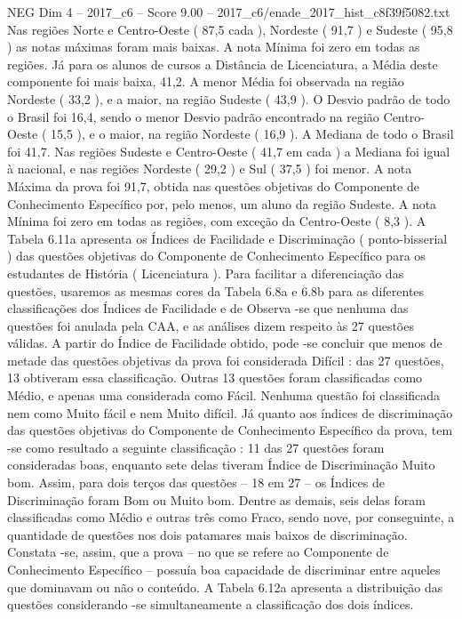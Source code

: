 \begin{textsample}{NEG Dim 4 – 2017\_c6 – Score 9.00 – 2017\_c6/enade\_2017\_hist\_c8f39f5082.txt}
Nas regiões Norte e Centro-Oeste ( 87,5 cada ), Nordeste ( 91,7 ) e Sudeste ( 95,8 ) as notas máximas foram mais baixas.
A nota Mínima foi zero em todas as regiões.
Já para os alunos de cursos a Distância de Licenciatura, a Média deste componente foi mais baixa, 41,2.
A menor Média foi observada na região Nordeste ( 33,2 ), e a maior, na região Sudeste ( 43,9 ).
O Desvio padrão de todo o Brasil foi 16,4, sendo o menor Desvio padrão encontrado na região Centro-Oeste ( 15,5 ), e o maior, na região Nordeste ( 16,9 ).
A Mediana de todo o Brasil foi 41,7.
Nas regiões Sudeste e Centro-Oeste ( 41,7 em cada ) a Mediana foi igual à nacional, e nas regiões Nordeste ( 29,2 ) e Sul ( 37,5 ) foi menor.
A nota Máxima da prova foi 91,7, obtida nas questões objetivas do Componente de Conhecimento Específico por, pelo menos, um aluno da região Sudeste.
A nota Mínima foi zero em todas as regiões, com exceção da Centro-Oeste ( 8,3 ).
A Tabela 6.11a apresenta os Índices de Facilidade e Discriminação ( ponto-bisserial ) das questões objetivas do Componente de Conhecimento Específico para os estudantes de História ( Licenciatura ).
Para facilitar a diferenciação das questões, usaremos as mesmas cores da Tabela 6.8a e 6.8b para as diferentes classificações dos Índices de Facilidade e de Observa -se que nenhuma das questões foi anulada pela CAA, e as análises dizem respeito às 27 questões válidas.
A partir do Índice de Facilidade obtido, pode -se concluir que menos de metade das questões objetivas da prova foi considerada Difícil : das 27 questões, 13 obtiveram essa classificação.
Outras 13 questões foram classificadas como Médio, e apenas uma considerada como Fácil.
Nenhuma questão foi classificada nem como Muito fácil e nem Muito difícil.
Já quanto aos índices de discriminação das questões objetivas do Componente de Conhecimento Específico da prova, tem -se como resultado a seguinte classificação : 11 das 27 questões foram consideradas boas, enquanto sete delas tiveram Índice de Discriminação Muito bom.
Assim, para dois terços das questões – 18 em 27 – os Índices de Discriminação foram Bom ou Muito bom.
Dentre as demais, seis delas foram classificadas como Médio e outras três como Fraco, sendo nove, por conseguinte, a quantidade de questões nos dois patamares mais baixos de discriminação.
Constata -se, assim, que a prova – no que se refere ao Componente de Conhecimento Específico – possuía boa capacidade de discriminar entre aqueles que dominavam ou não o conteúdo.
A Tabela 6.12a apresenta a distribuição das questões considerando -se simultaneamente a classificação dos dois índices.

\end{textsample}
